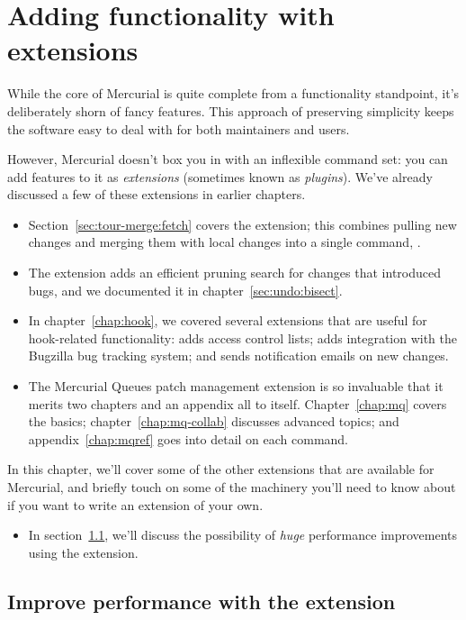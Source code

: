 \chapter{Adding functionality with extensions}
\label{chap:hgext}

While the core of Mercurial is quite complete from a functionality
standpoint, it's deliberately shorn of fancy features.  This approach
of preserving simplicity keeps the software easy to deal with for both
maintainers and users.

However, Mercurial doesn't box you in with an inflexible command set:
you can add features to it as \emph{extensions} (sometimes known as
\emph{plugins}).  We've already discussed a few of these extensions in
earlier chapters.
\begin{itemize}
\item Section~\ref{sec:tour-merge:fetch} covers the 
  extension; this combines pulling new changes and merging them with
  local changes into a single command, .
\item The  extension adds an efficient pruning search
  for changes that introduced bugs, and we documented it in
  chapter~\ref{sec:undo:bisect}.
\item In chapter~\ref{chap:hook}, we covered several extensions that
  are useful for hook-related functionality:  adds access
  control lists;  adds integration with the Bugzilla
  bug tracking system; and  sends notification emails on
  new changes.
\item The Mercurial Queues patch management extension is so invaluable
  that it merits two chapters and an appendix all to itself.
  Chapter~\ref{chap:mq} covers the basics;
  chapter~\ref{chap:mq-collab} discusses advanced topics; and
  appendix~\ref{chap:mqref} goes into detail on each command.
\end{itemize}

In this chapter, we'll cover some of the other extensions that are
available for Mercurial, and briefly touch on some of the machinery
you'll need to know about if you want to write an extension of your
own.
\begin{itemize}
\item In section~\ref{sec:hgext:inotify}, we'll discuss the
  possibility of \emph{huge} performance improvements using the
   extension.
\end{itemize}

\section{Improve performance with the  extension}
\label{sec:hgext:inotify}

